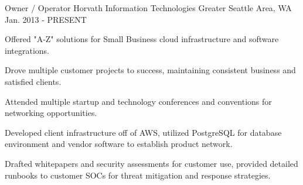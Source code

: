 


\begin{cventries}


\cventry
{Owner / Operator} %
{Horvath Information Technologies} %
{Greater Seattle Area, WA} %
{Jan. 2013 - PRESENT} %
{ %
\begin{cvitems}
\item {Offered "A-Z" solutions for Small Business cloud infrastructure and software integrations.}
\item {Drove multiple customer projects to success, maintaining consistent business and satisfied clients.}
\item {Attended multiple startup and technology conferences and conventions for networking opportunities.}
\item {Developed client infrastructure off of AWS, utilized PostgreSQL for database environment and vendor software to establish product network.}
\item {Drafted whitepapers and security assessments for customer use, provided detailed runbooks to customer SOCs for threat mitigation and response strategies.}
\end{cvitems}
}



\end{cventries}
